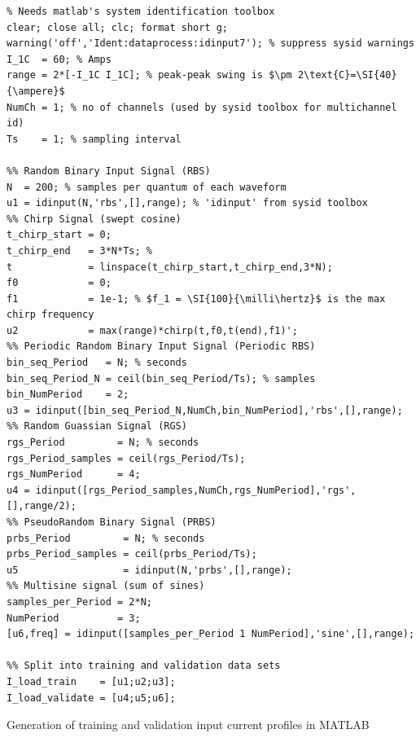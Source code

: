 \begin{listing}[!htbp]
\begin{verbatim}
% Needs matlab's system identification toolbox
clear; close all; clc; format short g;
warning('off','Ident:dataprocess:idinput7'); % suppress sysid warnings
I_1C  = 60; % Amps
range = 2*[-I_1C I_1C]; % peak-peak swing is $\pm 2\text{C}=\SI{40}{\ampere}$
NumCh = 1; % no of channels (used by sysid toolbox for multichannel id)
Ts    = 1; % sampling interval

%% Random Binary Input Signal (RBS)
N  = 200; % samples per quantum of each waveform
u1 = idinput(N,'rbs',[],range); % 'idinput' from sysid toolbox
%% Chirp Signal (swept cosine)
t_chirp_start = 0;
t_chirp_end   = 3*N*Ts; %
t             = linspace(t_chirp_start,t_chirp_end,3*N);
f0            = 0;
f1            = 1e-1; % $f_1 = \SI{100}{\milli\hertz}$ is the max chirp frequency
u2            = max(range)*chirp(t,f0,t(end),f1)';
%% Periodic Random Binary Input Signal (Periodic RBS)
bin_seq_Period   = N; % seconds
bin_seq_Period_N = ceil(bin_seq_Period/Ts); % samples
bin_NumPeriod    = 2;
u3 = idinput([bin_seq_Period_N,NumCh,bin_NumPeriod],'rbs',[],range);
%% Random Guassian Signal (RGS)
rgs_Period         = N; % seconds
rgs_Period_samples = ceil(rgs_Period/Ts);
rgs_NumPeriod      = 4;
u4 = idinput([rgs_Period_samples,NumCh,rgs_NumPeriod],'rgs',[],range/2);
%% PseudoRandom Binary Signal (PRBS)
prbs_Period         = N; % seconds
prbs_Period_samples = ceil(prbs_Period/Ts);
u5                  = idinput(N,'prbs',[],range);
%% Multisine signal (sum of sines)
samples_per_Period = 2*N;
NumPeriod          = 3;
[u6,freq] = idinput([samples_per_Period 1 NumPeriod],'sine',[],range);

%% Split into training and validation data sets
I_load_train    = [u1;u2;u3];
I_load_validate = [u4;u5;u6];
\end{verbatim}
\caption{Generation of training and validation input current profiles in MATLAB}
\label{codesnippet:trainvalidsysidinput}
\end{listing}


